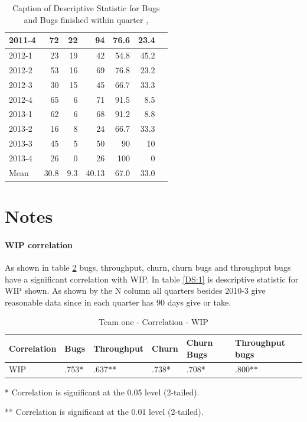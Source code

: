 \documentclass[UKenglish]{ifimaster}  %
\begin{document}
\begin{appendices}
\begin{table}[!htbp]
\begin{adjustwidth}{-2.5cm}{}
{{\begin{tabular}{ | l | r | r | r | r | r | r | }
2011-4 & 72 & 22 & 94 & 76.6& 23.4 \\ \hline
2012-1 & 23 & 19 & 42 & 54.8 & 45.2 \\ \hline
2012-2 & 53 & 16 & 69 & 76.8 & 23.2 \\ \hline
2012-3 & 30 & 15 & 45 & 66.7 & 33.3\\ \hline
2012-4 & 65 & 6 & 71 & 91.5 & 8.5 \\ \hline
2013-1 & 62 & 6 & 68 & 91.2 & 8.8 \\ \hline
2013-2 & 16 & 8 & 24 & 66.7 & 33.3 \\ \hline
2013-3 & 45 & 5 & 50 & 90 & 10 \\ \hline
2013-4 & 26 & 0 & 26 & 100 & 0 \\ \hline
Mean & 30.8&9.3&40.13&67.0&33.0 \\ \hline

\end{tabular}
}
}
\end{adjustwidth}
\caption[Optional caption for list of figures]{Caption of Descriptive Statistic for Bugs and Bugs finished within quarter  , }
\label{DS:10:5} %
\end{table}
 \end{appendices}
 


\newpage
\part{Notes}



\subsection{WIP correlation}
\label{sec:WIPC}
As shown in table \ref{corr:1} bugs, throughput, churn, churn bugs and throughput bugs have a significant correlation with WIP. In table \ref{DS:1} is descriptive statistic for WIP shown.  As shown by the N column all quarters besides 2010-3 give reasonable data since in each quarter has 90 days give or take. 

\begin{table}[!htbp] 
 \centering 
 \begin{tabular}{|l|l|l|l|l|l|} 
\hline 
Correlation  & Bugs & Throughput & Churn & Churn Bugs & Throughput bugs \\ \hline 
	WIP & .753* & .637** & .738* & .708* & .800** \\ \hline 
\end{tabular} 
 \caption{Team one - Correlation - 	WIP} 
 \label{corr:1}
    \centerline {* Correlation is significant at the 0.05 level (2-tailed).}
      \centerline{  ** Correlation is significant at the 0.01 level (2-tailed).}
 \end{table}  
 
\end{document}
